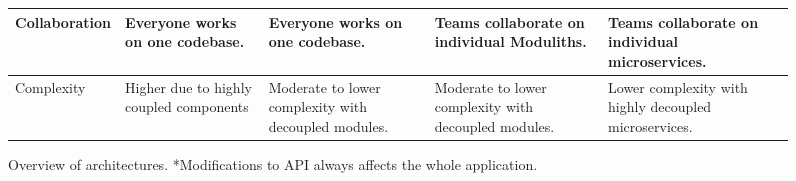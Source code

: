 \begin{sidewaysfigure}
\begin{tabular}{ |p{2.7cm}|p{3cm}|p{3cm}|p{4cm}|p{3cm}| }
        \hline
        Collaboration         & Everyone works on one codebase.                & Everyone works on one codebase.                      & Teams collaborate on individual Moduliths.                 & Teams collaborate on individual microservices.        \\
        \hline
        Complexity            & Higher due to highly coupled  components       & Moderate to lower complexity with decoupled modules. & Moderate to lower complexity with decoupled modules.       & Lower complexity with highly decoupled microservices. \\
        \hline
    \end{tabular}
    \caption{Overview of architectures. *Modifications to API always affects the whole application.\label{table:architecture_compare}}
\end{sidewaysfigure}